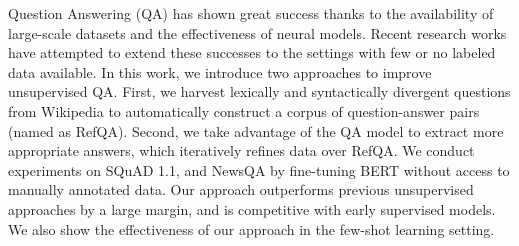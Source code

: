 Question Answering (QA) has shown great success thanks to the availability of large-scale datasets and the effectiveness of neural models. Recent research works have attempted to extend these successes to the settings with few or no labeled data available. In this work, we introduce two approaches to improve unsupervised QA. First, we harvest lexically and syntactically divergent questions from Wikipedia to automatically construct a corpus of question-answer pairs (named as RefQA). Second, we take advantage of the QA model to extract more appropriate answers, which iteratively refines data over RefQA. We conduct experiments on SQuAD 1.1, and NewsQA by fine-tuning BERT without access to manually annotated data. Our approach outperforms previous unsupervised approaches by a large margin, and is competitive with early supervised models. We also show the effectiveness of our approach in the few-shot learning setting.
